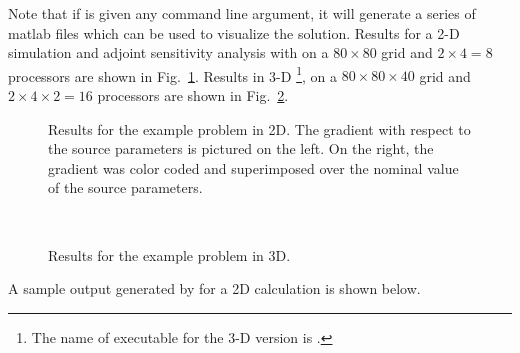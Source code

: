 Note that if  is given any command line argument, it will generate
a series of matlab files which can be used to visualize the solution.
Results for a 2-D simulation and adjoint sensitivity analysis with 
on a $80 \times 80$ grid and $2 \times 4 = 8$ processors are shown in Fig.~\ref{f:pvakx2D}.
Results in 3-D \footnote{The name of executable for the 3-D version is .}, 
on a $80 \times 80 \times 40$ grid and $2 \times 4 \times 2= 16$ processors
are shown in Fig.~\ref{f:pvakx3D}.
\begin{figure}
  {\centerline{}}
  \caption[Results for the  example problem in 2D.]
  {Results for the  example problem in 2D. 
    The gradient with respect to the source parameters is pictured on the left. 
    On the right, the gradient was color coded and superimposed over the nominal value 
    of the source parameters.}
  \label{f:pvakx2D}
\end{figure}
\begin{figure}
  \begin{center}
    \mbox{
    }
    \mbox{
    }
  \end{center}
  \caption{Results for the  example problem in 3D.}
  \label{f:pvakx3D}
\end{figure}
A sample output generated by  for a 2D calculation is shown below.

\vspace{0.1in}

